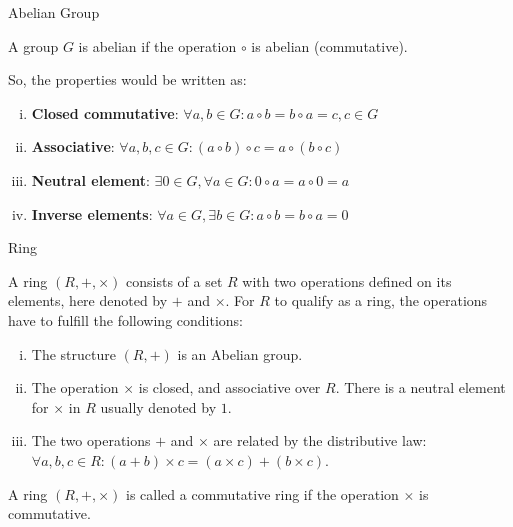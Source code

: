 \begin{frame}[t]{Abelian Group}

	A group \cite{Paar2010understanding, Menezes2012handbook} $G$ is abelian if the operation $\circ$ is abelian (commutative). 
	
	\bigskip
	
	So, the properties would be written as: 
	
	\medskip
	
	\begin{enumerate}[i.]
		\item \textbf{Closed commutative}: $\forall a, b \in G: a \circ b = b \circ a = c, c \in G$
		\item \textbf{Associative}: $\forall a, b, c \in G: (a \circ b) \circ c = a \circ (b \circ c)$
		\item \textbf{Neutral element}: $\exists 0 \in G, \forall a \in G: 0 \circ a = a \circ 0 = a$
		\item \textbf{Inverse elements}: $\forall a \in G, \exists b \in G: a \circ b = b \circ a = 0$
	\end{enumerate}

\end{frame}

\begin{frame}[t]{Ring}

	A ring \cite{Rijndael2020design} $(R, +, \times)$ consists of a set $R$ with two operations defined on its elements, here denoted by $+$ and $\times$. For $R$ to qualify as a ring, the operations have to fulfill the following conditions:
	
	\medskip

	\begin{enumerate}[i.]
		\item The structure $(R, +)$ is an Abelian group.
		\item The operation $\times$ is closed, and associative over $R$. There is a neutral element for $\times$ in $R$ usually denoted by $1$.
		\item The two operations $+$ and $\times$ are related by the distributive law: $\forall a, b, c \in R : (a + b) \times c = (a \times c) + (b \times c)$. 
	\end{enumerate}

	\medskip

	A ring $(R, +, \times)$ is called a commutative ring if the operation $\times$ is commutative.
\end{frame}

